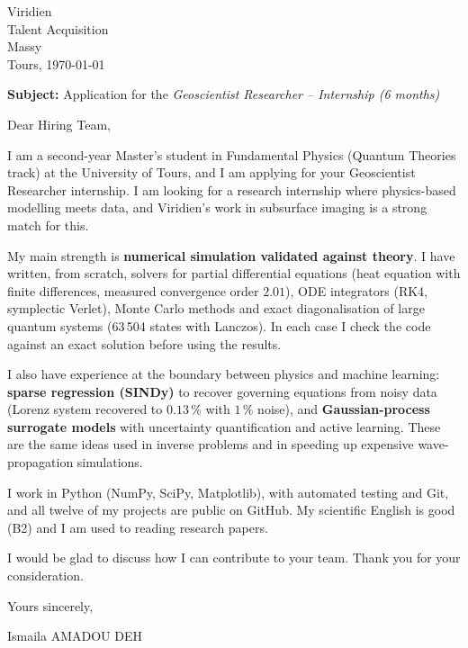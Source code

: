
\renewcommand{\destinataire}[2]{\null\hfill\begin{minipage}[t]{0.45\linewidth}#1\\[6pt]Tours, \today\end{minipage}\par\medskip\textbf{Subject:} #2\par}
\renewcommand{\signature}{\par\bigskip\hfill Ismaila AMADOU DEH}
\entete
\destinataire{Viridien\\Talent Acquisition\\Massy}{Application for the \emph{Geoscientist Researcher -- Internship (6 months)}}

Dear Hiring Team,

I am a second-year Master's student in Fundamental Physics (Quantum Theories track) at the University of Tours, and I am applying for your Geoscientist Researcher internship. I am looking for a research internship where physics-based modelling meets data, and Viridien's work in subsurface imaging is a strong match for this.

My main strength is \textbf{numerical simulation validated against theory}. I have written, from scratch, solvers for partial differential equations (heat equation with finite differences, measured convergence order $2.01$), ODE integrators (RK4, symplectic Verlet), Monte Carlo methods and exact diagonalisation of large quantum systems (63\,504 states with Lanczos). In each case I check the code against an exact solution before using the results.

I also have experience at the boundary between physics and machine learning: \textbf{sparse regression (SINDy)} to recover governing equations from noisy data (Lorenz system recovered to $0.13\,\%$ with $1\,\%$ noise), and \textbf{Gaussian-process surrogate models} with uncertainty quantification and active learning. These are the same ideas used in inverse problems and in speeding up expensive wave-propagation simulations.

I work in Python (NumPy, SciPy, Matplotlib), with automated testing and Git, and all twelve of my projects are public on GitHub. My scientific English is good (B2) and I am used to reading research papers.

I would be glad to discuss how I can contribute to your team. Thank you for your consideration.

Yours sincerely,
\signature

